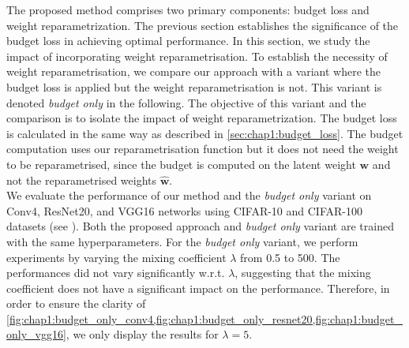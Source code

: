 
The proposed method comprises two primary components: budget loss and weight
reparametrization. The previous section establishes the significance of the
budget loss in achieving optimal performance. In this section, we study the
impact of incorporating weight reparametrisation. To establish the necessity of
weight reparametrisation, we compare our approach with a variant where the
budget loss is applied but the weight reparametrisation is not. This variant is
denoted \emph{budget only} in the following. The objective of this variant and
the comparison is to isolate the impact of weight reparametrization. The budget
loss is calculated in the same way as described in \cref{sec:chap1:budget_loss}.
The budget computation uses our reparametrisation function but it does not need
the weight to be reparametrised, since the budget is computed on the latent
weight $\mathbf{w}$ and not the reparametrised weights $\mathbf{\hat{w}}$.\\


We evaluate the performance of our method and the \emph{budget only} variant on
Conv4, ResNet20, and VGG16 networks using CIFAR-10 and CIFAR-100 datasets (see
).
Both the proposed approach and \emph{budget only} variant are trained with the
same hyperparameters. For the \textit{budget only} variant,  we perform
experiments by varying the mixing coefficient $\lambda$ from 0.5 to 500. The
performances did not vary significantly w.r.t. $\lambda$, suggesting that the
mixing coefficient does not have a significant impact on the performance.
Therefore, in order to ensure the clarity of
\cref{fig:chap1:budget_only_conv4,fig:chap1:budget_only_resnet20,fig:chap1:budget_only_vgg16},
we only display the results for $\lambda = 5$.\\

